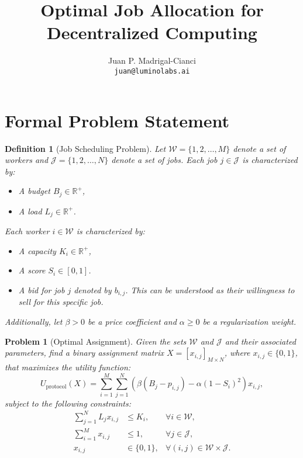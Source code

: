 \documentclass{article}
\title{Optimal Job Allocation for Decentralized Computing}
\author{Juan P. Madrigal-Cianci\\ \texttt{juan@luminolabs.ai}}
\newtheorem{definition}{Definition}
\newtheorem{problem}{Problem}
\begin{document}
\maketitle


\section{Formal Problem Statement}

\begin{definition}[Job Scheduling Problem]
Let $\mathcal{W} = \{1, 2, \dots, M\}$ denote a set of workers and $\mathcal{J} = \{1, 2, \dots, N\}$ denote a set of jobs. Each job $j \in \mathcal{J}$ is characterized by:
\begin{itemize}
    \item A budget $B_j \in \mathbb{R}^+$,
    \item A load $L_j \in \mathbb{R}^+$.
\end{itemize}
Each worker $i \in \mathcal{W}$ is characterized by:
\begin{itemize}
    \item A capacity $K_i \in \mathbb{R}^+$,
    \item A score $S_i \in [0, 1]$.
    \item A \textit{bid} for job $j$ denoted by $b_{i,j}$. This can be understood as their \textit{willingness to sell} for this specific job.
\end{itemize}
Additionally, let $\beta > 0$ be a price coefficient and $\alpha \geq 0$ be a regularization weight.
\end{definition}

\begin{problem}[Optimal Assignment]\label{problem:optimal-assignment}
Given the sets $\mathcal{W}$ and $\mathcal{J}$ and their associated parameters, find a binary assignment matrix $X = [x_{i,j}]_{M \times N}$, where $x_{i,j} \in \{0, 1\}$, that maximizes the utility function:
\[
U_{\text{protocol}}(X) = \sum_{i=1}^M \sum_{j=1}^N \left( \beta (B_j-p_{i,j}) - \alpha (1 - S_i)^2 \right) x_{i,j},
\]
subject to the following constraints:
\begin{align}
    \sum_{j=1}^N L_j x_{i,j} &\leq K_i, & \forall i \in \mathcal{W}, \label{eq:capacity} \\
    \sum_{i=1}^M x_{i,j} &\leq 1, & \forall j \in \mathcal{J}, \label{eq:assignment} \\
    x_{i,j} &\in \{0, 1\}, & \forall (i, j) \in \mathcal{W} \times \mathcal{J}. \label{eq:binary}
\end{align}
\end{problem}
\end{document}
